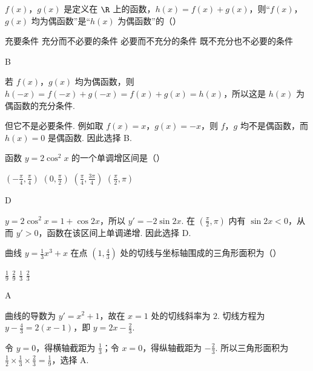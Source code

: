 \begin{problem}
\(f(x)\)，\(g(x)\) 是定义在 \(\R\) 上的函数，\(h(x) = f(x) + g(x)\)，则“\(f(x)\)，\(g(x)\) 均为偶函数”是“\(h(x)\) 为偶函数”的（\quad）

\choices
    {充要条件}
    {充分而不必要的条件}
    {必要而不充分的条件}
    {既不充分也不必要的条件}
\end{problem}

\begin{answer}
B
\end{answer}

\begin{solution}
若 \(f(x)\)，\(g(x)\) 均为偶函数，则
\(h(-x)=f(-x)+g(-x)=f(x)+g(x)=h(x)\)，所以这是 \(h(x)\) 为偶函数的充分条件.

但它不是必要条件. 例如取 \(f(x)=x\)，\(g(x)=-x\)，则 \(f\)，\(g\) 均不是偶函数，而 \(h(x)=0\) 是偶函数. 因此选择 B.
\end{solution}

\begin{problem}
函数 \( y = 2\cos^2 x \) 的一个单调增区间是（\quad）

\choices
    {\(\left(-\frac{\pi}{4}, \frac{\pi}{4}\right)\)}
    {\(\left(0, \frac{\pi}{2}\right)\)}
    {\(\left(\frac{\pi}{4}, \frac{3\pi}{4}\right)\)}
    {\(\left(\frac{\pi}{2}, \pi\right)\)}
\end{problem}

\begin{answer}
D
\end{answer}

\begin{solution}
\(y=2\cos^2x=1+\cos2x\)，所以 \(y'=-2\sin2x\). 在
\(\left(\frac{\pi}{2},\pi\right)\) 内有 \(\sin2x<0\)，从而 \(y'>0\)，函数在该区间上单调递增. 因此选择 D.
\end{solution}

\begin{problem}
曲线 \( y = \frac{1}{3}x^{3} + x \) 在点 \(\left(1, \frac{4}{3}\right)\) 处的切线与坐标轴围成的三角形面积为（\quad）

\choices
    {\(\frac{1}{9}\)}
    {\(\frac{2}{9}\)}
    {\(\frac{1}{3}\)}
    {\(\frac{2}{3}\)}
\end{problem}

\begin{answer}
A
\end{answer}

\begin{solution}
曲线的导数为 \(y'=x^2+1\)，故在 \(x=1\) 处的切线斜率为 \(2\). 切线方程为
\(y-\frac{4}{3}=2(x-1)\)，即 \(y=2x-\frac{2}{3}\).

令 \(y=0\)，得横轴截距为 \(\frac{1}{3}\)；令 \(x=0\)，得纵轴截距为 \(-\frac{2}{3}\). 所以三角形面积为
\(\frac{1}{2}\times\frac{1}{3}\times\frac{2}{3}=\frac{1}{9}\)，选择 A.
\end{solution}

